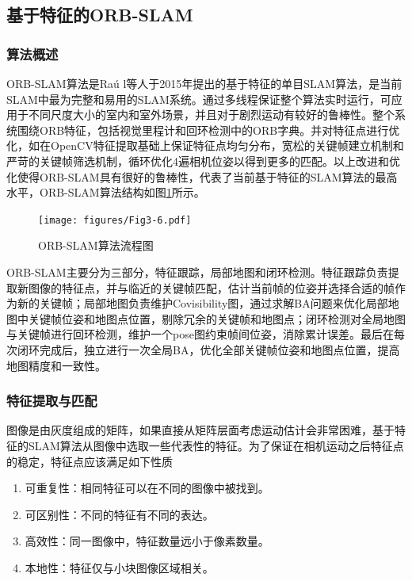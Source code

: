 \subsection{基于特征的ORB-SLAM}

\subsubsection{算法概述}
ORB-SLAM算法是Ra\'u l等人于2015年提出的基于特征的单目SLAM算法，是当前SLAM中最为完整和易用的SLAM系统。通过多线程保证整个算法实时运行，可应用于不同尺度大小的室内和室外场景，并且对于剧烈运动有较好的鲁棒性。整个系统围绕ORB特征\upcite{[3.8]}，包括视觉里程计和回环检测中的ORB字典\upcite{[3.9]}。并对特征点进行优化，如在OpenCV特征提取基础上保证特征点均匀分布，宽松的关键帧建立机制和严苛的关键帧筛选机制，循环优化4遍相机位姿以得到更多的匹配。以上改进和优化使得ORB-SLAM具有很好的鲁棒性，代表了当前基于特征的SLAM算法的最高水平，ORB-SLAM算法结构\upcite{[1.20]}如图\ref{fig3.6}所示。

\begin{figure}[h]
\centering
\texttt{[image: figures/Fig3-6.pdf]}
\caption{ORB-SLAM算法流程图}
\label{fig3.6}
\end{figure}

ORB-SLAM主要分为三部分，特征跟踪，局部地图和闭环检测。特征跟踪负责提取新图像的特征点，并与临近的关键帧匹配，估计当前帧的位姿并选择合适的帧作为新的关键帧；局部地图负责维护Covisibility图，通过求解BA问题来优化局部地图中关键帧位姿和地图点位置，剔除冗余的关键帧和地图点；闭环检测对全局地图与关键帧进行回环检测，维护一个pose图约束帧间位姿，消除累计误差。最后在每次闭环完成后，独立进行一次全局BA，优化全部关键帧位姿和地图点位置，提高地图精度和一致性。


\subsubsection{特征提取与匹配}
图像是由灰度组成的矩阵，如果直接从矩阵层面考虑运动估计会非常困难，基于特征的SLAM算法从图像中选取一些代表性的特征。为了保证在相机运动之后特征点的稳定，特征点应该满足如下性质
\begin{enumerate}[label={(\arabic*)}]
\item 可重复性：相同特征可以在不同的图像中被找到。
\item 可区别性：不同的特征有不同的表达。
\item 高效性：同一图像中，特征数量远小于像素数量。
\item 本地性：特征仅与小块图像区域相关。
\end{enumerate}

